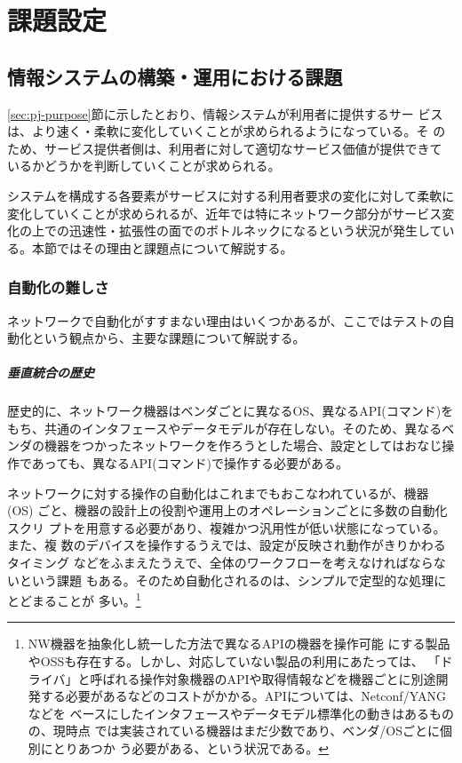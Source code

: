 
\chapter{課題設定}
\label{chap:problem-setting}

 \section{情報システムの構築・運用における課題}
 \label{sec:system-problem}

\ref{sec:pj-purpose}節に示したとおり、情報システムが利用者に提供するサー
ビスは、より速く・柔軟に変化していくことが求められるようになっている。そ
のため、サービス提供者側は、利用者に対して適切なサービス価値が提供できて
いるかどうかを判断していくことが求められる。

システムを構成する各要素がサービスに対する利用者要求の変化に対して柔軟に
変化していくことが求められるが、近年では特にネットワーク部分がサービス変
化の上での迅速性・拡張性の面でのボトルネックになるという状況が発生してい
る。本節ではその理由と課題点について解説する。


  \subsection{自動化の難しさ}
  \label{sec:difficulty}

ネットワークで自動化がすすまない理由はいくつかあるが、ここではテストの自
動化という観点から、主要な課題について解説する。

    \paragraph{垂直統合の歴史}
歴史的に、ネットワーク機器はベンダごとに異なるOS、異なるAPI(コマンド)を
もち、共通のインタフェースやデータモデルが存在しない。そのため、異なるベ
ンダの機器をつかったネットワークを作ろうとした場合、設定としてはおなじ操
作であっても、異なるAPI(コマンド)で操作する必要がある。

ネットワークに対する操作の自動化はこれまでもおこなわれているが、機器(OS)
ごと、機器の設計上の役割や運用上のオペレーションごとに多数の自動化スクリ
プトを用意する必要があり、複雑かつ汎用性が低い状態になっている。また、複
数のデバイスを操作するうえでは、設定が反映され動作がきりかわるタイミング
などをふまえたうえで、全体のワークフローを考えなければならないという課題
もある。そのため自動化されるのは、シンプルで定型的な処理にとどまることが
多い。\footnote{NW機器を抽象化し統一した方法で異なるAPIの機器を操作可能
にする製品やOSSも存在する。しかし、対応していない製品の利用にあたっては、
「ドライバ」と呼ばれる操作対象機器のAPIや取得情報などを機器ごとに別途開
発する必要があるなどのコストがかかる。APIについては、Netconf/YANGなどを
ベースにしたインタフェースやデータモデル標準化の動きはあるものの、現時点
では実装されている機器はまだ少数であり、ベンダ/OSごとに個別にとりあつか
う必要がある、という状況である。}

